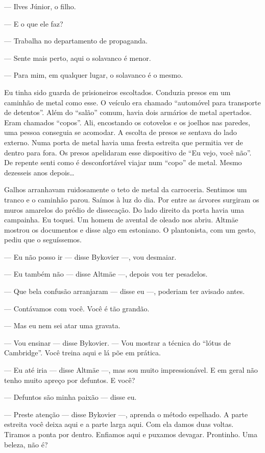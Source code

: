 --- Ilves Júnior, o filho.

--- E o que ele faz?

--- Trabalha no departamento de propaganda.

--- Sente mais perto, aqui o solavanco é menor.

--- Para mim, em qualquer lugar, o solavanco é o mesmo.

Eu tinha sido guarda de prisioneiros escoltados. Conduzia presos em um
caminhão de metal como esse. O veículo era chamado ``automóvel para
transporte de detentos''. Além do ``salão'' comum, havia dois armários
de metal apertados. Eram chamados ``copos''. Ali, encostando os
cotovelos e os joelhos nas paredes, uma pessoa conseguia se acomodar. A
escolta de presos se sentava do lado externo. Numa porta de metal havia
uma fresta estreita que permitia ver de dentro para fora. Os presos
apelidaram esse dispositivo de ``Eu vejo, você não''. De repente senti
como é desconfortável viajar num ``copo'' de metal. Mesmo dezesseis anos
depois\ldots{}

Galhos arranhavam ruidosamente o teto de metal da carroceria. Sentimos um
tranco e o caminhão parou. Saímos à luz do dia. Por entre as árvores
surgiram os muros amarelos do prédio de dissecação. Do lado direito da
porta havia uma campainha. Eu toquei. Um homem de avental de oleado nos
abriu. Altmäe mostrou os documentos e disse algo em estoniano. O
plantonista, com um gesto, pediu que o seguíssemos.

--- Eu não posso ir --- disse Bykovier ---, vou desmaiar.

--- Eu também não --- disse Altmäe ---, depois vou ter pesadelos.

--- Que bela confusão arranjaram --- disse eu ---, poderiam ter avisado
antes.

--- Contávamos com você. Você é tão grandão.

--- Mas eu nem sei atar uma gravata.

--- Vou ensinar --- disse Bykovier. --- Vou mostrar a técnica do ``lótus
de Cambridge''. Você treina aqui e lá põe em prática.

--- Eu até iria --- disse Altmäe ---, mas sou muito impressionável. E em
geral não tenho muito apreço por defuntos. E você?

--- Defuntos são minha paixão --- disse eu.

--- Preste atenção --- disse Bykovier ---, aprenda o método espelhado. A
parte estreita você deixa aqui e a parte larga aqui. Com ela damos duas
voltas. Tiramos a ponta por dentro. Enfiamos aqui e puxamos devagar.
Prontinho. Uma beleza, não é?

